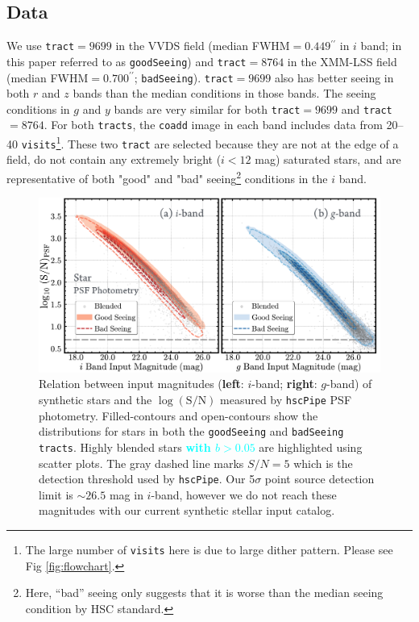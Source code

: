 \documentclass[useamsfonts]{pasj01}
\def\asec{$^{\prime\prime}$}
\def\hscpipe{\texttt{hscPipe}}
\def\coadd{\texttt{coadd}}
\def\tract{\texttt{tract}}
\def\tracts{\texttt{tracts}}
\def\visits{\texttt{visits}}
\newcommand{\song}[1]{\textcolor{cyan} {\textbf{#1}}}
\begin{document}
\subsection{Data}
    We use \tract{}$=9699$ in the VVDS field (median FWHM$=0.449$\asec{} in $i$ band;
    in this paper referred to as \texttt{goodSeeing}) and
    \tract{}$=8764$ in the XMM-LSS field (median FWHM$=0.700$\asec{};
    \texttt{badSeeing}).
    \tract{}$=9699$ also has better seeing in both $r$ and $z$ bands than the median 
    conditions in those bands.
    The seeing conditions in $g$ and $y$ bands are very similar for both
    \tract{}$=9699$ and \tract{}$=8764$.
    For both \tracts{}, the \coadd{} image in each band includes data from
    20--40 \visits{}\footnote{The large number of \visits{} here is due to large 
    dither pattern. Please see Fig \ref{fig:flowchart}.}.  
    These two \tract{} are selected because they are not at the edge of a field, do 
    not contain any extremely bright ($i<12$ mag) saturated stars, and are 
    representative of both "good" and "bad" seeing\footnote{Here, ``bad'' seeing only 
    suggests that it is worse than the median seeing condition by HSC standard.} 
    conditions in the $i$ band.

\begin{figure}
    \begin{center}
        \includegraphics[width=\textwidth]{fig/synpipe_psf_sn}
    \end{center}
    \caption{
        Relation between input magnitudes (\textbf{left}: $i$-band; \textbf{right}:
        $g$-band) of synthetic stars and the $\log (\mathrm{S}/\mathrm{N})$ measured 
        by \hscpipe{} PSF photometry.
        Filled-contours and open-contours show the distributions for
        stars in both the \texttt{goodSeeing} and \texttt{badSeeing} \tracts{}. 
        Highly blended stars \song{with $b>0.05$} are highlighted using scatter 
        plots.
        The gray dashed line marks $S/N = 5$ which is the detection threshold used 
        by \hscpipe{}.  
        Our 5$\sigma$ point source detection limit is ${\sim}26.5$ mag in $i$-band,
        however we do not reach these magnitudes with our current synthetic stellar 
        input catalog.
        }
    \label{fig:star_sn}
\end{figure}
\end{document}
